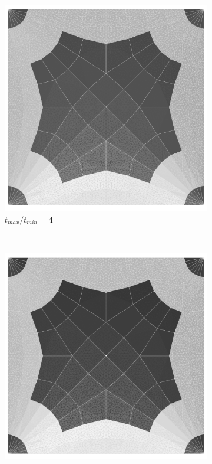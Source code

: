 \begin{figure}[H]
\begin{subfigure}[b]{.32\textwidth}
  \centering
  \includegraphics[width=.99\linewidth]{images/t_opt_l2d15_gamma4}
  \caption{$t_{max}/t_{min}=4$}
\end{subfigure}
~
\begin{subfigure}[b]{.32\textwidth}
  \centering
  \includegraphics[width=.99\linewidth]{images/t_opt_l2d15_gamma5}

\end{subfigure}
\end{figure}

